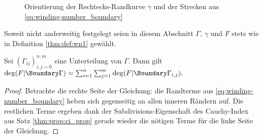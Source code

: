 \documentclass{mythesis}
\begin{document}
\begin{figure}[ht]
    \centering
    \caption{Orientierung der Rechtecks-Randkurve $\gamma$ und der Strecken aus \eqref{eq:winding-number_boundary}}
    \label{fig:rectboundary}
\end{figure}

Soweit nicht anderweitig festgelegt seien in diesem Abschnitt $\Gamma$, $\gamma$ und $F$ stets wie in Definition \ref{thm:def:wn1} gewählt.


\begin{proposition}[Subdivision] \label{thm:prop:winding-number_subdivision}
    Sei $(\Gamma_{ij})_{i,j=0}^{n,m}$ eine Unterteilung von $\Gamma$.
    Dann gilt
    \begin{math}
        \deg(F|\Boundary\Gamma) = \sum_{i=1}^n \sum_{j=1}^m \deg(F|\Boundary\Gamma_{i,j}).
    \end{math}
    \begin{proof}
        Betrachte die rechte Seite der Gleichung: die Randterme aus \eqref{eq:winding-number_boundary} heben sich gegenseitig an allen inneren Rändern auf.
        Die restlichen Terme ergeben dank der Subdivisions-Eigenschaft des Cauchy-Index aus Satz \ref{thm:prop:ci_prop} gerade wieder die nötigen Terme für die linke Seite der Gleichung.
    \end{proof}
\end{proposition}
\end{document}
